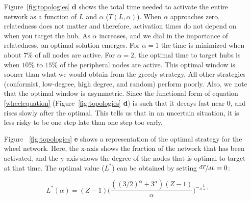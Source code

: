 \documentclass[preprint,superscriptaddress,floatfix]{article}
\begin{document}
Figure~\ref{fig:topologies} \textbf{d} shows the total time needed to activate the entire network as a function of $L$ and $\alpha$ ($T(L,\alpha)$). When $\alpha$ approaches zero, relatedness does not matter and therefore, activation times do not depend on when you target the hub. As $\alpha$ increases, and we dial in the importance of relatedness, an optimal solution emerges. For $\alpha = 1$ the time is minimized when about $7\%$ of all nodes are active. For $\alpha=2$, the optimal time to target hubs is when  $10\%$ to $15\%$ of the peripheral nodes are active. This optimal window is sooner than what we would obtain from the greedy strategy. All other strategies (conformist, low-degree, high degree, and random) perform poorly. Also, we note that the optimal window is asymmetric. Since the functional form of equation \ref{wheelequation} (Figure~\ref{fig:topologies} \textbf{d}) is such that it decays fast near $0$, and rises slowly after the optimal. This tells us that in an uncertain situation, it is less risky to be one step late than one step too early. 

Figure ~\ref{fig:topologies} \textbf{e} shows a representation of the optimal strategy for the wheel network. Here, the x-axis shows the fraction of the network that has been activated, and the y-axis shows the degree of the nodes that is optimal to target at that time. The optimal value ($L^\ast$) can be obtained by setting $\nicefrac{dT}{dL}=0$:

\begin{equation}
    L^\ast(\alpha) = (Z-1)\bigg(\frac{((3/2)^\alpha+3^\alpha)(Z-1)}{\alpha}\bigg)^{-\frac{1}{\alpha+1}}
\label{tmin}
\end{equation}
\end{document}
